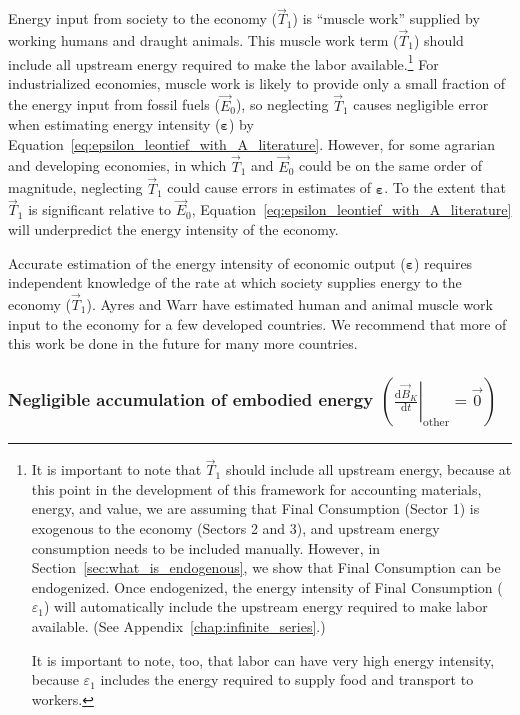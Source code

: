 Energy input from society to the economy ($\vec{T}_{1}$)
is ``muscle work'' supplied by working humans 
and draught animals.\cite{Ayres:2003ec,Ayres:2010ug,Warr:2012cg} 
This muscle work term ($\vec{T}_{1}$) should include
all upstream energy required to make the labor available.\footnote{It is important
to note that $\vec{T}_{1}$ should include all upstream energy,
because at this point in the development of this framework 
for accounting materials, energy, and value,
we are assuming that Final Consumption (Sector 1) is exogenous to the economy 
(Sectors 2 and 3), 
and upstream energy consumption needs to be included manually.
However, in Section~\ref{sec:what_is_endogenous}, we show that Final Consumption
can be endogenized.
Once endogenized, the energy intensity of Final Consumption ($\varepsilon_{1}$) 
will automatically include the upstream energy required to make labor available.
(See Appendix~\ref{chap:infinite_series}.)

It is important to note, too, that labor can have very high energy intensity, 
because $\varepsilon_{1}$ includes the energy required to supply food and transport
to workers.} 
For industrialized economies, muscle work 
is likely to provide only a small fraction
of the energy input from fossil fuels ($\vec{E}_{0}$),
so neglecting $\vec{T}_{1}$ causes negligible error when
estimating energy intensity ($\bm{\varepsilon}$) by
Equation~\ref{eq:epsilon_leontief_with_A_literature}.
However, for some agrarian 
and developing economies, 
in which $\vec{T}_{1}$ and $\vec{E}_{0}$ 
could be on the same order of magnitude,
neglecting $\vec{T}_{1}$ could cause errors
in estimates of $\bm{\varepsilon}$.
To the extent that $\vec{T}_{1}$ 
is significant relative to $\vec{E}_{0}$,
Equation~\ref{eq:epsilon_leontief_with_A_literature}
will underpredict the energy intensity of the economy.

Accurate estimation of the energy intensity of economic output ($\bm{\varepsilon}$)
requires independent knowledge of the rate at which society supplies
energy to the economy ($\vec{T}_{1}$). 
Ayres and Warr have estimated human and animal muscle work
input to the economy for a few developed countries.\cite{Ayres:2010ug}
We recommend that more of this work be done 
in the future for many more countries.


\subsubsection{Negligible accumulation of embodied energy
$\left( \left. \frac{\mathrm{d}\vec{B}_{K}}{\mathrm{d}t} \right|_{\mathrm{other}} = \vec{0} \right)$}

